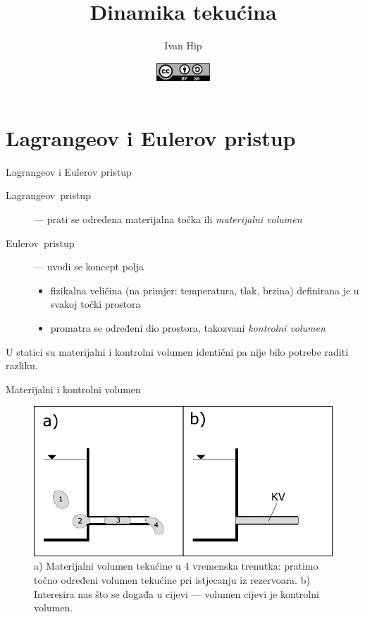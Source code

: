 \documentclass[croatian]{beamer}
\begin{document}
\title{Dinamika tekućina}
\author{Ivan Hip}
\date{\includegraphics[width=0.15\textwidth]{../CC-by-sa.pdf}}

\begin{frame}
  \titlepage
\end{frame}

\section{Lagrangeov i Eulerov pristup}

\begin{frame}{Lagrangeov i Eulerov pristup}

\begin{description}
\item [{Lagrangeov~pristup}] --- prati se određena materijalna točka
ili \emph{materijalni volumen}
\item [{Eulerov~pristup}] --- uvodi se koncept polja

\begin{itemize}
\item fizikalna veličina (na primjer: temperatura, tlak, brzina) definirana
je u svakoj točki prostora
\item promatra se određeni dio prostora, takozvani \emph{kontrolni volumen}
\end{itemize}

\end{description}
U statici su materijalni i kontrolni volumen identični pa nije bilo
potrebe raditi razliku.
\end{frame}

\begin{frame}{Materijalni i kontrolni volumen}

\begin{figure}
\begin{centering}
\includegraphics[width=0.8\paperwidth]{slike/slika-mat-vs-kont}
\par\end{centering}
\caption{a) Materijalni volumen tekućine u 4 vremenska trenutka: pratimo točno
određeni volumen tekućine pri istjecanju iz rezervoara. b) Interesira
nas što se događa u cijevi --- volumen cijevi je kontrolni volumen.}
\end{figure}
\end{frame}
\end{document}
